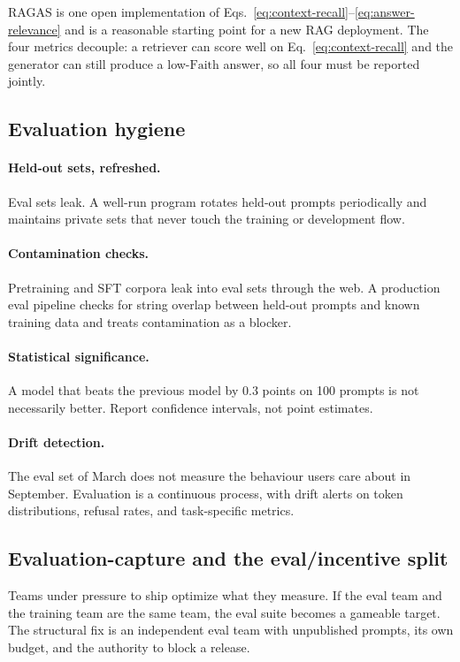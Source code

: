 RAGAS \citep{es2024ragas} is one open implementation of
Eqs.~\eqref{eq:context-recall}--\eqref{eq:answer-relevance} and is
a reasonable starting point for a new RAG deployment. The four
metrics decouple: a retriever can score well on
Eq.~\eqref{eq:context-recall} and the generator can still produce
a low-$\mathrm{Faith}$ answer, so all four must be reported
jointly.

\subsection{Evaluation hygiene}

\paragraph{Held-out sets, refreshed.}
Eval sets leak. A well-run program rotates held-out prompts
periodically and maintains private sets that never touch the
training or development flow.

\paragraph{Contamination checks.} Pretraining and SFT corpora
leak into eval sets through the web. A production eval pipeline
checks for string overlap between held-out prompts and known
training data and treats contamination as a blocker.

\paragraph{Statistical significance.} A model that beats the
previous model by 0.3 points on 100 prompts is not necessarily
better. Report confidence intervals, not point estimates.

\paragraph{Drift detection.} The eval set of March does not
measure the behaviour users care about in September. Evaluation is
a continuous process, with drift alerts on token distributions,
refusal rates, and task-specific metrics.

\subsection{Evaluation-capture and the eval/incentive split}

Teams under pressure to ship optimize what they measure. If the
eval team and the training team are the same team, the eval suite
becomes a gameable target. The structural fix is an independent
eval team with unpublished prompts, its own budget, and the
authority to block a release.

